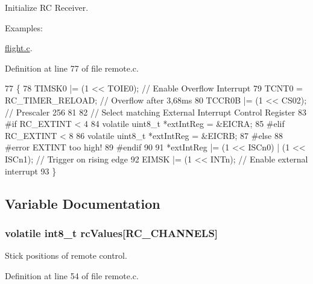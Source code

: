 Initialize R\-C Receiver. 

\begin{Desc}
\item[Examples\-: ]\par
\hyperlink{flight_8c-example}{flight.\-c}.\end{Desc}


Definition at line 77 of file remote.\-c.


\begin{DoxyCode}
77                   \{
78     TIMSK0 |= (1 << TOIE0); \textcolor{comment}{// Enable Overflow Interrupt}
79     TCNT0 = RC\_TIMER\_RELOAD; \textcolor{comment}{// Overflow after 3,68ms}
80     TCCR0B |= (1 << CS02); \textcolor{comment}{// Prescaler 256}
81 
82     \textcolor{comment}{// Select matching External Interrupt Control Register}
83 \textcolor{preprocessor}{#if RC\_EXTINT < 4}
84 \textcolor{preprocessor}{}    \textcolor{keyword}{volatile} uint8\_t *extIntReg = &EICRA;
85 \textcolor{preprocessor}{#elif RC\_EXTINT < 8}
86 \textcolor{preprocessor}{}    \textcolor{keyword}{volatile} uint8\_t *extIntReg = &EICRB;
87 \textcolor{preprocessor}{#else}
88 \textcolor{preprocessor}{}\textcolor{preprocessor}{#error EXTINT too high!}
89 \textcolor{preprocessor}{}\textcolor{preprocessor}{#endif}
90 \textcolor{preprocessor}{}
91     *extIntReg |= (1 << ISCn0) | (1 << ISCn1); \textcolor{comment}{// Trigger on rising edge}
92     EIMSK |= (1 << INTn); \textcolor{comment}{// Enable external interrupt}
93 \}
\end{DoxyCode}


\subsection{Variable Documentation}
\hypertarget{group__remote_gabcacf6e881a9c8d7e83e8bdf7f72dda5}{
\subsubsection[{rc\-Values}]{\setlength{\rightskip}{0pt plus 5cm}volatile int8\-\_\-t rc\-Values\mbox{[}{\bf R\-C\-\_\-\-C\-H\-A\-N\-N\-E\-L\-S}\mbox{]}}}\label{group__remote_gabcacf6e881a9c8d7e83e8bdf7f72dda5}


Stick positions of remote control. 



Definition at line 54 of file remote.\-c.



